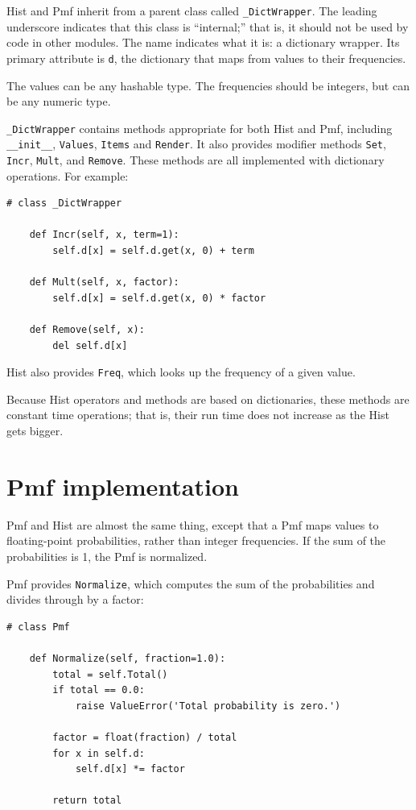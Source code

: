 Hist and Pmf inherit from a parent class called \verb"_DictWrapper".
The leading underscore indicates that this class is ``internal;'' that
is, it should not be used by code in other modules.  The name
indicates what it is: a dictionary wrapper.  Its primary attribute is
{\tt d}, the dictionary that maps from values to their frequencies.

The values can be any hashable type.  The frequencies should be integers,
but can be any numeric type.

\verb"_DictWrapper" contains methods appropriate for both
Hist and Pmf, including \verb"__init__", {\tt Values},
{\tt Items} and {\tt Render}.  It also provides modifier
methods {\tt Set}, {\tt Incr}, {\tt Mult}, and {\tt Remove}.  These
methods are all implemented with dictionary operations.  For example:

\begin{verbatim}
# class _DictWrapper

    def Incr(self, x, term=1):
        self.d[x] = self.d.get(x, 0) + term

    def Mult(self, x, factor):
        self.d[x] = self.d.get(x, 0) * factor

    def Remove(self, x):
        del self.d[x]
\end{verbatim}

Hist also provides {\tt Freq}, which looks up the frequency
of a given value.

Because Hist operators and methods are based on dictionaries,
these methods are constant time operations;
that is, their run time does not increase as the Hist gets bigger.


\section{Pmf implementation}

Pmf and Hist are almost the same thing, except that a Pmf
maps values to floating-point probabilities, rather than integer
frequencies.  If the sum of the probabilities is 1, the Pmf is normalized.

Pmf provides {\tt Normalize}, which computes the sum of the
probabilities and divides through by a factor:

\begin{verbatim}
# class Pmf

    def Normalize(self, fraction=1.0):
        total = self.Total()
        if total == 0.0:
            raise ValueError('Total probability is zero.')

        factor = float(fraction) / total
        for x in self.d:
            self.d[x] *= factor

        return total
\end{verbatim}

